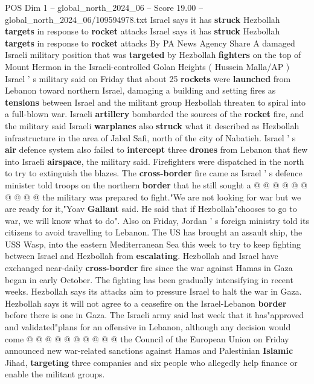 \begin{textsample}{POS Dim 1 – global\_north\_2024\_06 – Score 19.00 – global\_north\_2024\_06/109594978.txt}  \label{ex:f1_pos_315}
Israel says it has \textbf{struck} Hezbollah \textbf{targets} in response to \textbf{rocket} attacks Israel says it has \textbf{struck} Hezbollah \textbf{targets} in response to \textbf{rocket} attacks By PA News Agency Share A damaged Israeli military position that was \textbf{targeted} by Hezbollah \textbf{fighters} on the top of Mount Hermon in the Israeli-controlled Golan Heights ( Hussein Malla/AP ) Israel ' s military said on Friday that about 25 \textbf{rockets} were \textbf{launched} from Lebanon toward northern Israel, damaging a building and setting fires as \textbf{tensions} between Israel and the militant group Hezbollah threaten to spiral into a full-blown war.
Israeli \textbf{artillery} bombarded the sources of the \textbf{rocket} fire, and the military said Israeli \textbf{warplanes} also \textbf{struck} what it described as Hezbollah infrastructure in the area of Jabal Safi, north of the city of Nabatieh.
Israel ' s \textbf{air} defence system also failed to \textbf{intercept} three \textbf{drones} from Lebanon that flew into Israeli \textbf{airspace}, the military said.
Firefighters were dispatched in the north to try to extinguish the blazes.
The \textbf{cross-border} fire came as Israel ' s defence minister told troops on the northern \textbf{border} that he still sought a @ @ @ @ @ @ @ @ @ @ the military was prepared to fight."We are not looking for war but we are ready for it,"Yoav \textbf{Gallant} said.
He said that if Hezbollah"chooses to go to war, we will know what to do".
Also on Friday, Jordan ' s foreign ministry told its citizens to avoid travelling to Lebanon.
The US has brought an assault ship, the USS Wasp, into the eastern Mediterranean Sea this week to try to keep fighting between Israel and Hezbollah from \textbf{escalating}.
Hezbollah and Israel have exchanged near-daily \textbf{cross-border} fire since the war against Hamas in Gaza began in early October.
The fighting has been gradually intensifying in recent weeks.
Hezbollah says its attacks aim to pressure Israel to halt the war in Gaza.
Hezbollah says it will not agree to a ceasefire on the Israel-Lebanon \textbf{border} before there is one in Gaza.
The Israeli army said last week that it has"approved and validated"plans for an offensive in Lebanon, although any decision would come @ @ @ @ @ @ @ @ @ @ the Council of the European Union on Friday announced new war-related sanctions against Hamas and Palestinian \textbf{Islamic} Jihad, \textbf{targeting} three companies and six people who allegedly help finance or enable the militant groups.

\end{textsample}
